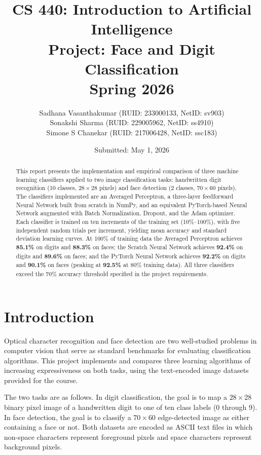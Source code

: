 \documentclass[12pt]{article}
\title{
  \vspace{-1cm}
  \textbf{CS 440: Introduction to Artificial Intelligence}\\[0.4em]
  \large\textbf{Project: Face and Digit Classification}\\[0.3em]
  \normalsize Spring 2026
}
\author{
  Sadhana Vasanthakumar \quad (RUID: 233000133, NetID: sv903)\\
  Sonakshi Sharma \qquad\quad\;\; (RUID: 229005962, NetID: ss4910)\\
  Simone S Chanekar \quad\;\;\;\; (RUID: 217006428, NetID: ssc183)
}
\date{Submitted: May 1, 2026}
\begin{document}
\maketitle
\thispagestyle{empty}

\begin{abstract}
This report presents the implementation and empirical comparison of three machine learning
classifiers applied to two image classification tasks: handwritten digit recognition
(10 classes, $28\times28$ pixels) and face detection (2 classes, $70\times60$ pixels).
The classifiers implemented are an Averaged Perceptron, a three-layer feedforward Neural
Network built from scratch in NumPy, and an equivalent PyTorch-based Neural Network
augmented with Batch Normalization, Dropout, and the Adam optimizer. Each classifier is
trained on ten increments of the training set (10\%--100\%), with five independent random
trials per increment, yielding mean accuracy and standard deviation learning curves.
At 100\% of training data the Averaged Perceptron achieves \textbf{85.1\%} on digits
and \textbf{88.3\%} on faces; the Scratch Neural Network achieves \textbf{92.4\%} on
digits and \textbf{89.6\%} on faces; and the PyTorch Neural Network achieves
\textbf{92.2\%} on digits and \textbf{90.1\%} on faces (peaking at \textbf{92.5\%} at
80\% training data). All three classifiers exceed the 70\% accuracy threshold specified
in the project requirements.
\end{abstract}

\newpage
\tableofcontents
\newpage

\section{Introduction}
\label{sec:intro}

Optical character recognition and face detection are two well-studied problems in computer
vision that serve as standard benchmarks for evaluating classification algorithms. This
project implements and compares three learning algorithms of increasing expressiveness on
both tasks, using the text-encoded image datasets provided for the course.

The two tasks are as follows. In digit classification, the goal is to map a $28\times28$
binary pixel image of a handwritten digit to one of ten class labels (0 through 9). In
face detection, the goal is to classify a $70\times60$ edge-detected image as either
containing a face or not. Both datasets are encoded as ASCII text files in which non-space
characters represent foreground pixels and space characters represent background pixels.
\end{document}
